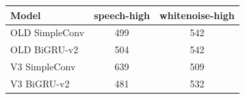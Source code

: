 \begin{tabular}{lcc}
\toprule
Model & speech-high & whitenoise-high \\
\midrule
OLD SimpleConv & 499 & 542 \\
OLD BiGRU-v2 & 504 & 542 \\
V3 SimpleConv & 639 & 509 \\
V3 BiGRU-v2 & 481 & 532 \\
\bottomrule
\end{tabular}
